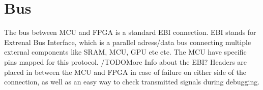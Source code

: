 \documentclass[../main/report.tex]{subfiles}
\begin{document}
\section{Bus}
The bus between MCU and FPGA is a standard EBI connection.
EBI stands for Extrenal Bus Interface, which is a parallel adress/data bus connecting multiple external components like SRAM, MCU, GPU etc etc.
The MCU have specific pins mapped for this protocol. /TODO{More Info about the EBI?}
Headers are placed in between the MCU and FPGA in case of failure on either side of the connection, as well as an easy way to check transmitted signals during debugging.
\end{document}
